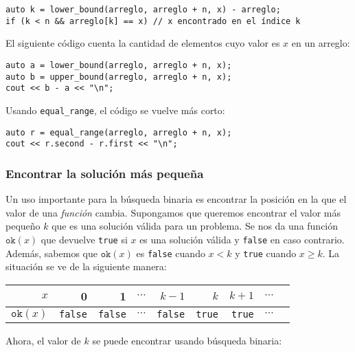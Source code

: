\begin{lstlisting}
auto k = lower_bound(arreglo, arreglo + n, x) - arreglo;
if (k < n && arreglo[k] == x) // x encontrado en el índice k
\end{lstlisting}

El siguiente código cuenta la cantidad de elementos
cuyo valor es $x$ en un arreglo:

\begin{lstlisting}
auto a = lower_bound(arreglo, arreglo + n, x);
auto b = upper_bound(arreglo, arreglo + n, x);
cout << b - a << "\n";
\end{lstlisting}

Usando \texttt{equal\_range}, el código se vuelve más corto:

\begin{lstlisting}
auto r = equal_range(arreglo, arreglo + n, x);
cout << r.second - r.first << "\n";
\end{lstlisting}

\subsubsection{Encontrar la solución más pequeña}

Un uso importante para la búsqueda binaria es
encontrar la posición en la que el valor de una \emph{función} cambia.
Supongamos que queremos encontrar el valor más pequeño $k$
que es una solución válida para un problema.
Se nos da una función $\texttt{ok}(x)$
que devuelve \texttt{true} si $x$ es una solución válida
y \texttt{false} en caso contrario.
Además, sabemos que $\texttt{ok}(x)$ es \texttt{false}
cuando $x < k$ y \texttt{true} cuando $x \ge k$.
La situación se ve de la siguiente manera:

\begin{center}
    \begin{tabular}{r|rrrrrrrr}
        $x$              & 0              & 1              & $\cdots$      & $k-1$         & $k$      & $k+1$ & $\cdots$ \\
        \hline
        $\texttt{ok}(x)$ & \texttt{false} & \texttt{false}
                         & $\cdots$       & \texttt{false} & \texttt{true} & \texttt{true} & $\cdots$                    \\
    \end{tabular}
\end{center}

\noindent
Ahora, el valor de $k$ se puede encontrar usando búsqueda binaria:


